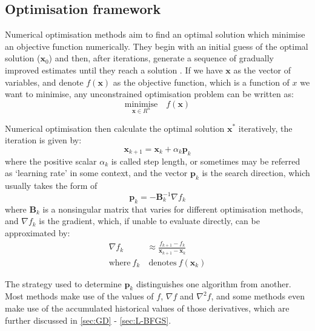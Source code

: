 \subsection{Optimisation framework} \label{sec:Optimisation framework}
Numerical optimisation methods aim to find an optimal solution which minimise an objective function numerically. They begin with an initial guess of the optimal solution ($\textbf{x}_{0}$) and then, after iterations, generate a sequence of gradually improved estimates until they reach a solution \cite{Nocedal2006}. If we have $\textbf{x}$ as the vector of variables, and denote $f(\textbf{x})$ as the objective function, which is a function of $x$ we want to minimise, any unconstrained optimisation problem can be written as:
\begin{equation}
  \underset{\textbf{x}\in R^n}{\text{minimise}}\quad f(\textbf{x})
  \label{eq:minimise_F}
\end{equation}

Numerical optimisation then calculate the optimal solution $\textbf{x}^*$ iteratively, the iteration is given by:
\begin{equation}
  \textbf{x}_{k+1} = \textbf{x}_k+\alpha_k \textbf{p}_k
  \label{eq:optimisation_iteration}
\end{equation}
where the positive scalar $\alpha_k$ is called step length, or sometimes may be referred as `learning rate' in some context, and the vector $\textbf{p}_k$ is the search direction, which usually takes the form of
\begin{equation}
  \textbf{p}_k = -\textbf{B}_k^{-1} \nabla f_{k} \label{eq:general-descent-direction}
\end{equation}
where $\textbf{B}_k$ is a nonsingular matrix that varies for different optimisation methods, and $\nabla f_k$ is the gradient, which, if unable to evaluate directly, can be approximated by:
\begin{align}
  \nabla f_k         & \approx \frac{f_{k+1}-f_{k}}{\textbf{x}_{k+1}-\textbf{x}_{k}} \nonumber \\
  \text{where}\  f_k & \ \text{denotes}\  f(\textbf{x}_k)
\end{align}

The strategy used to determine $\textbf{p}_k$ distinguishes one algorithm from another. Most methods make use of the values of $f$, $\nabla f$ and $\nabla^2 f$, and some methods even make use of the accumulated historical values of those derivatives, which are further discussed in \cref{sec:GD} - \cref{sec:L-BFGS}.


